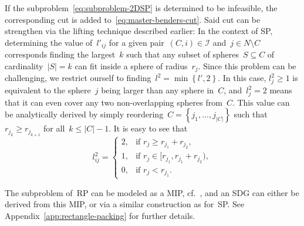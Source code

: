 \documentclass[a4paper,10pt]{article}
\newcommand{\lift}{l}
\newcommand{\rectanglepack}{RP\xspace}
\newcommand{\spherepack}{SP\xspace}
\newcommand{\brackets}[1]{\left\{ #1 \right\}}
\theoremstyle{definition}
\begin{document}
If the subproblem~\eqref{eq:subproblem-2DSP} is determined to be infeasible, the corresponding cut is added to~\eqref{eq:master-benders-cut}.
Said cut can be strengthen via the lifting technique described earlier:
In the context of \spherepack, determining the value of~$\lift'_{ij}$ for a given pair~$(C, i)\in \mathcal{I}$ and~$j\in N\setminus C$ corresponds finding the largest~$k$ such that any subset of spheres~$S\subseteq C$ of cardinality~$|S| = k$ can fit inside a sphere of radius~$r_j$.
Since this problem can be challenging, we restrict ourself to finding~$\lift^2 = \min\brackets{\lift', 2}$.
In this case, $\lift^2_j \geq 1$ is equivalent to the sphere~$j$ being larger than any sphere in~$C$, and~$\lift^2_j = 2$ means that it can even cover any two non-overlapping spheres from~$C$.
This value can be analytically derived by simply reordering~$C = \brackets{j_1, ..., j_{|C|}}$ such that~$r_{j_k} \geq r_{j_{k+1}}$ for all~$k\leq |C| -1$.
It is easy to see that
\begin{equation}
  \lift^2_{ij} = \begin{cases}
    2, & \text{if } r_j \geq r_{j_1} + r_{j_2}, \\
    1, & \text{if } r_j \in [r_{j_1}, r_{j_1} + r_{j_2} ), \\
    0, & \text{if } r_j < r_{j_1}.
  \end{cases}
\end{equation}

The subproblem of~\rectanglepack can be modeled as a MIP, cf.~\cite{pisinger2007using}, and an SDG can either be derived from this MIP, or via a similar construction as for~\spherepack.
See Appendix~\ref{app:rectangle-packing} for further details.

%
%
\end{document}
